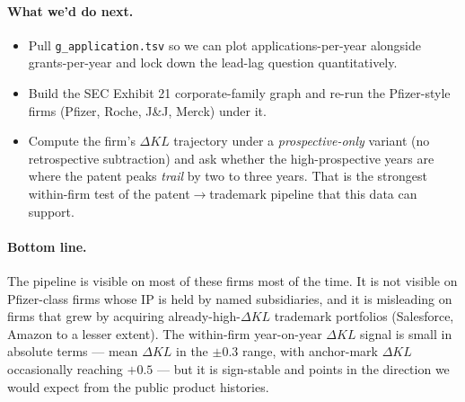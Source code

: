 \documentclass[11pt]{article}
\newcommand{\dKL}{\Delta KL}
\begin{document}
\paragraph{What we'd do next.}
\begin{itemize}
\item Pull \texttt{g\_application.tsv} so we can plot
applications-per-year alongside grants-per-year and lock down the
lead-lag question quantitatively.
\item Build the SEC Exhibit 21 corporate-family graph and re-run the
Pfizer-style firms (Pfizer, Roche, J\&J, Merck) under it.
\item Compute the firm's $\dKL$ trajectory under a
\emph{prospective-only} variant (no retrospective subtraction) and
ask whether the high-prospective years are where the patent peaks
\emph{trail} by two to three years. That is the strongest
within-firm test of the patent$\to$trademark pipeline that this
data can support.
\end{itemize}

\paragraph{Bottom line.} The pipeline is visible on most of these
firms most of the time. It is not visible on Pfizer-class
firms whose IP is held by named subsidiaries, and it is misleading
on firms that grew by acquiring already-high-$\dKL$ trademark
portfolios (Salesforce, Amazon to a lesser extent). The within-firm
year-on-year $\dKL$ signal is small in absolute terms --- mean
$\dKL$ in the $\pm 0.3$ range, with anchor-mark $\dKL$ occasionally
reaching $+0.5$ --- but it is sign-stable and points in the
direction we would expect from the public product histories.
\end{document}
